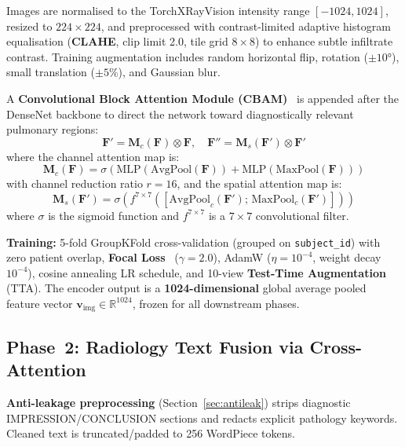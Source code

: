 \documentclass[conference]{IEEEtran}
\begin{document}
Images are normalised to the TorchXRayVision intensity range $[-1024, 1024]$, resized to $224 \times 224$, and preprocessed with contrast-limited adaptive histogram equalisation (\textbf{CLAHE}, clip limit 2.0, tile grid $8 \times 8$) to enhance subtle infiltrate contrast. Training augmentation includes random horizontal flip, rotation ($\pm10°$), small translation ($\pm5\%$), and Gaussian blur.

A \textbf{Convolutional Block Attention Module (CBAM)}~\cite{woo2018cbam} is appended after the DenseNet backbone to direct the network toward diagnostically relevant pulmonary regions:
\begin{equation}
  \mathbf{F}' = \mathbf{M}_c(\mathbf{F}) \otimes \mathbf{F}, \quad \mathbf{F}'' = \mathbf{M}_s(\mathbf{F}') \otimes \mathbf{F}'
\end{equation}
where the channel attention map is:
\begin{equation}
  \mathbf{M}_c(\mathbf{F}) = \sigma\!\left(\text{MLP}\!\left(\text{AvgPool}(\mathbf{F})\right) + \text{MLP}\!\left(\text{MaxPool}(\mathbf{F})\right)\right)
  \label{eq:channel}
\end{equation}
with channel reduction ratio $r\!=\!16$, and the spatial attention map is:
\begin{equation}
  \mathbf{M}_s(\mathbf{F}') = \sigma\!\left(f^{7\times7}\!\left([\text{AvgPool}_c(\mathbf{F}');\,\text{MaxPool}_c(\mathbf{F}')]\right)\right)
  \label{eq:spatial}
\end{equation}
where $\sigma$ is the sigmoid function and $f^{7\times7}$ is a $7\times7$ convolutional filter.

\textbf{Training:} 5-fold GroupKFold cross-validation (grouped on \texttt{subject\_id}) with zero patient overlap, \textbf{Focal Loss}~\cite{lin2017focal} ($\gamma\!=\!2.0$), AdamW ($\eta\!=\!10^{-4}$, weight decay $10^{-4}$), cosine annealing LR schedule, and 10-view \textbf{Test-Time Augmentation} (TTA). The encoder output is a \textbf{1024-dimensional} global average pooled feature vector $\mathbf{v}_{\text{img}} \in \mathbb{R}^{1024}$, frozen for all downstream phases.

\subsection{Phase~2: Radiology Text Fusion via Cross-Attention}

\textbf{Anti-leakage preprocessing} (Section~\ref{sec:antileak}) strips diagnostic IMPRESSION/CONCLUSION sections and redacts explicit pathology keywords. Cleaned text is truncated/padded to 256 WordPiece tokens.
\end{document}

